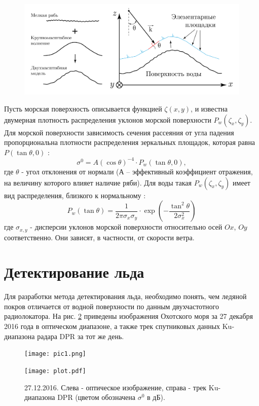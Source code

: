 \begin{figure}[h!]
  \centering
  \includegraphics[width = .98\linewidth]{img/quazz.pdf}
  \caption{}
  \label{fig:2}
\end{figure}

Пусть морская поверхность описывается функцией $\zeta(x,y)$, и известна двумерная плотность распределения уклонов
морской поверхности $P_w(\zeta_x,\zeta_y)$. Для морской поверхности зависимость сечения рассеяния от угла падения
пропорциональна плотности распределения зеркальных площадок, которая равна
$P(\tan \theta, 0)$  \cite{bassfuks}:
\begin{equation}
  \sigma^0 = A (\cos \theta)^{-4} \cdot P_w(\tan \theta,0),
  \label{eq:3}
\end{equation}
где $\theta$ - угол отклонения от нормали (А – эффективный коэффициент отражения, на величину которого влияет наличие
ряби). Для воды такая $P_w(\zeta_x,\zeta_y)$ имеет вид распределения, близкого к нормальному \cite{masha}:
\begin{equation}
  P_w(\tan \theta) = \frac{1}{ 2 \pi \sigma_x \sigma_y } \cdot \exp (- \frac{\tan^2\theta}{2 \sigma^2_x})
  \label{eq:4}
\end{equation}
где $\sigma_{x,y}$ - дисперсии уклонов морской поверхности относительно осей $Ox$, $Oy$ соответственно. Они зависят, в
частности, от скорости ветра.

\section{Детектирование льда}
Для разработки метода детектирования льда, необходимо понять, чем ледяной покров отличается от водной поверхности по
данным двухчастотного радиолокатора. На рис. \ref{fig:3} приведены изображения Охотского моря за 27 декабря 2016
года в оптическом диапазоне, а также трек спутниковых данных Ku-диапазона радара DPR за тот же день.

\begin{figure}[h!]
  \centering
  \begin{minipage}{.49\linewidth}
    \texttt{[image: pic1.png]}
  \end{minipage}
  \begin{minipage}{.49\linewidth}
    \texttt{[image: plot.pdf]}
  \end{minipage}
  \caption{27.12.2016. Слева - оптическое изображение, справа - трек Ku-диапазона DPR (цветом обозначена $\sigma^0$ в дБ).}
  \label{fig:3}
\end{figure}

